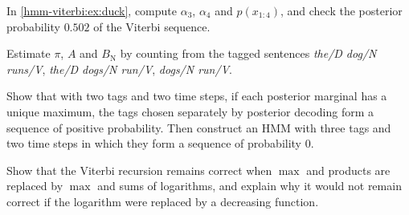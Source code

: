 \begin{notechapter}
\begin{exercise}\label{hmm-viterbi:exr:2}
In \cref{hmm-viterbi:ex:duck}, compute $\alpha_3$, $\alpha_4$ and $p(x_{1:4})$, and check the posterior probability $0.502$ of the Viterbi
sequence.
\end{exercise}

\begin{exercise}\label{hmm-viterbi:exr:3}
Estimate $\pi$, $A$ and $B_{\mathrm N}$ by counting from the tagged sentences \emph{the/D dog/N runs/V}, \emph{the/D dogs/N
run/V}, \emph{dogs/N run/V}.
\end{exercise}

\begin{exercise}\label{hmm-viterbi:exr:4}
Show that with two tags and two time steps, if each posterior marginal has a unique maximum,
the tags chosen separately by posterior decoding form a sequence of positive probability. Then construct an HMM with three tags and two
time steps in which they form a sequence of probability $0$.
\end{exercise}

\begin{exercise}\label{hmm-viterbi:exr:5}
Show that the Viterbi recursion remains correct when $\max$ and products are replaced by $\max$ and
sums of logarithms, and explain why it would not remain correct if the logarithm were replaced
by a decreasing function.
\end{exercise}
\end{notechapter}
